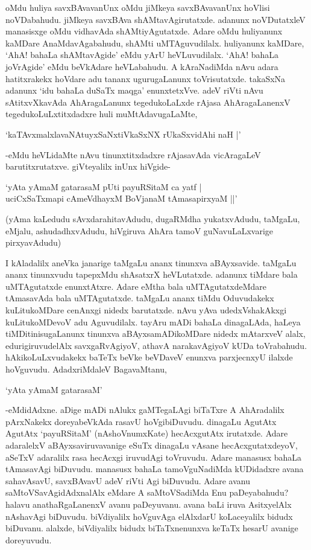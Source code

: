 oMdu huliya savxBAvavanUnx oMdu jiMkeya savxBAvavanUnx hoVlisi noVDabahudu. jiMkeya savxBAva shAMtavAgirutatxde. adanunx noVDutatxleV manasisxge oMdu vidhavAda shAMtiyAgutatxde. Adare oMdu huliyanunx kaMDare AnaMdavAgabahudu, shAMti uMTAguvudilalx. huliyanunx kaMDare, `AhA! bahaLa shAMtavAgide' eMdu yArU heVLuvudilalx. `AhA! bahaLa joVrAgide' eMdu beVkAdare heVLabahudu. A kAraNadiMda nAvu adara hatitxrakekx hoVdare adu tananx ugurugaLanunx toVrisutatxde. takaSxNa adanunx `idu bahaLa duSaTx maqga' enunxtetxVve. adeV riVti nAvu sAtitxvXkavAda AhAragaLanunx tegedukoLaLxde rAjasa AhAragaLanenxV tegedukoLuLxtitxdadxre huli muMtAdavugaLaMte,


\begin{shloka}
`kaTAvxmalxlavaNAtuyxSaNxtiVkaSxNX rUkaSxvidAhi naH |'
\end{shloka}

-eMdu heVLidaMte nAvu tinunxtitxdadxre rAjasavAda vicAragaLeV barutitxrutatxve. giVteyalilx inUnx hiVgide-

\begin{shloka}
`yAta yAmaM gatarasaM pUti payuRSitaM ca yatf |\\
uciCxSaTxmapi cAmeVdhayxM BoVjanaM tAmasapirxyaM ||'
\end{shloka}

(yAma kaLedudu sAvxdarahitavAdudu, dugaRMdha yukatxvAdudu, taMgaLu, eMjalu, ashudadhxvAdudu, hiVgiruva AhAra tamoV guNavuLaLxvarige pirxyavAdudu)

I kAladalilx aneVka janarige taMgaLu ananx tinunxva aBAyxsavide. taMgaLu ananx tinunxvudu tapepxMdu shAsatxrX heVLutatxde. adanunx tiMdare bala uMTAgutatxde enunxtAtxre. Adare eMtha bala uMTAgutatxdeMdare tAmasavAda bala uMTAgutatxde. taMgaLu ananx tiMdu Oduvudakekx kuLitukoMDare cenAnxgi nidedx barutatxde. nAvu yAva udedxVshakAkxgi kuLitukoMDevoV adu Aguvudilalx. tayAru mADi bahaLa dinagaLAda, haLeya tiMDitinisugaLanunx tinunxva aBAyxsamADikoMDare nidedx mAtarxveV alalx, edurigiruvudelAlx savxgaRvAgiyoV, athavA narakavAgiyoV kUDa toVrabahudu. hAkikoLuLxvudakekx baTeTx beVke beVDaveV enunxva parxjecnxyU ilalxde hoVguvudu. AdadxriMdaleV BagavaMtanu,

\begin{shloka}
`yAta yAmaM gatarasaM'
\end{shloka}


-eMdidAdxne. aDige mADi nAlukx gaMTegaLAgi biTaTxre A AhAradalilx pArxNakekx doreyabeVkAda rasavU hoVgibiDuvudu. dinagaLu AgutAtx AgutAtx `payuRSitaM' (nAshoVnumxKate) hecAcxgutAtx irutatxde. Adare adaralelxV aBAyxsaviruvavanige eSuTx dinagaLu vAsane hecAcxgutatxdeyoV, aSeTxV adaralilx rasa hecAcxgi iruvudAgi toVruvudu. Adare manasusx bahaLa tAmasavAgi biDuvudu. manasusx bahaLa tamoVguNadiMda kUDidadxre avana sahavAsavU, savxBAvavU adeV riVti Agi biDuvudu. Adare avanu saMtoVSavAgidAdxnalAlx eMdare A saMtoVSadiMda Enu paDeyabahudu? halavu anathaRgaLanenxV avanu paDeyuvanu. avana baLi iruva AsitxyelAlx nAshavAgi biDuvudu. biVdiyalilx hoVguvAga elAlxdarU koLaceyalilx bidudx biDuvanu. alalxde, biVdiyalilx bidudx biTaTxnenunxva keTaTx hesarU avanige doreyuvudu.

